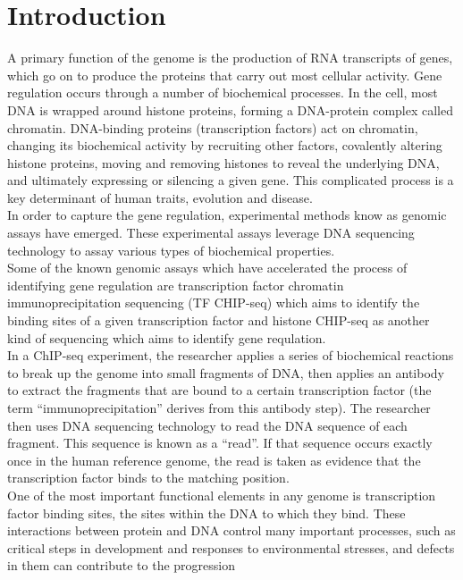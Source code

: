 \documentclass[11pt,letterpaper]{article}
\begin{document}
\section{Introduction}
A primary function of the genome is the production of RNA transcripts of
genes, which go on to produce the proteins that carry out most cellular activity\cite{muto2002transcription}. Gene regulation
occurs through a number of biochemical processes. In the cell, most DNA is wrapped around 
histone proteins, forming a DNA-protein complex called chromatin. DNA-binding proteins (transcription
factors) act on chromatin, changing its biochemical activity by recruiting other factors,
covalently altering histone proteins, moving and removing histones to reveal the underlying DNA,
and ultimately expressing or silencing a given gene. This complicated process is a key determinant
of human traits, evolution and disease\cite{chi2010covalent}.\\
In order to capture the gene regulation, experimental methods know as genomic assays have emerged.
These experimental assays leverage DNA sequencing technology to assay various
types of biochemical properties.\\
Some of the known genomic assays which have accelerated the process of identifying gene regulation are transcription factor chromatin immunoprecipitation sequencing (TF CHIP-seq) which aims to identify the binding sites of a given transcription factor and histone CHIP-seq as another kind of sequencing which aims to identify gene requlation.\\
In a ChIP-seq experiment, the researcher applies a series
of biochemical reactions to break up the genome into small fragments of DNA, then applies an
antibody to extract the fragments that are bound to a certain transcription factor (the term “immunoprecipitation” derives
from this antibody step). The researcher then uses DNA sequencing technology to read the DNA
sequence of each fragment. This sequence is known as a “read”. If that sequence occurs exactly
once in the human reference genome, the read is taken as evidence that the transcription factor
binds to the matching position\cite{overballe2012next}.\\
One of the most important functional elements in any
genome is transcription factor binding sites, the sites within
the DNA to which they bind. These interactions between
protein and DNA control many important processes, such as
critical steps in development and responses to environmental
stresses, and defects in them can contribute to the progression
\end{document}

